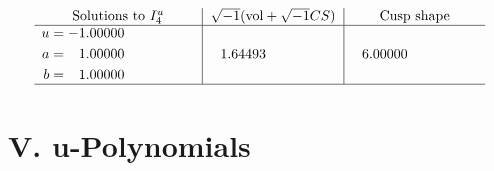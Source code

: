 \documentclass[1p]{elsarticle_modified}
\theoremstyle{definition}
\newcommand{\I}{\sqrt{-1}}
\begin{document}
$$\begin{array}{c|c|c}  
\text{Solutions to }I^u_{4}& \I (\text{vol} + \sqrt{-1}CS) & \text{Cusp shape}\\
 \hline 
\begin{aligned}
u &= -1.00000\phantom{ +0.000000I} \\
a &= \phantom{-}1.00000\phantom{ +0.000000I} \\
b &= \phantom{-}1.00000\phantom{ +0.000000I}\end{aligned}
 & \phantom{-}1.64493\phantom{ +0.000000I} & \phantom{-}6.00000\phantom{ +0.000000I}\\
 \hline 
 \end{array}$$\newpage
\newpage\renewcommand{\arraystretch}{1}
\centering \section*{ V. u-Polynomials}
\end{document}
